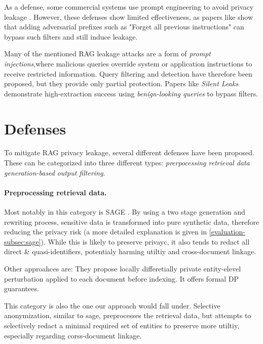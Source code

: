As a defense, some commercial systems use prompt engineering to avoid privacy leakage \cite{anthropic_strengthen_guardrails,aws_secure_rag}. However, these defenses show limited effectiveness, as papers like \cite{targetingTheCore} show that adding  adversarial prefixes such as "Forget all previous instructions" can bypass such filters and still induce leakage.

Many of the mentioned RAG leakage attacks are a form of \textit{prompt injections},where malicious queries override system or application instructions to receive restricted information. Query filtering and detection have therefore been proposed, but they provide only partial protection. Papers like \textit{Silent Leaks} \cite{silentLeaks} demonstrate high-extraction success using 
\textit{benign-looking queries} to bypass filters.



\section{Defenses}
To mitigate RAG privacy leakage, several different defenses have been proposed. These can be categorized into three different types: \textit{prerpocessing retrieval data} \textit{generation-based} \textit{output filtering}. 

\paragraph{Preprocessing retrieval data.} Most notably in this category is SAGE \cite{ragSAGE}. By using a two stage generation and rewriting process, sensitive data is transformed into pure synthetic data, therefore reducing the privacy risk (a more detailed explanation is given in \ref{evaluation-subsec:sage}). While this is likely to preserve privayc, it also tends to redact all direct \& quasi-identifiers, potentialy harming utiltiy and cross-document linkage.

Other approahces are: \cite{LPRAG} They propose  locally differetially private entity-elevel perturbation applied to each document before indexing. It offers formal DP guarantees.

This category is also the one our approach would fall under. Selective anonymization, similar to sage, preprocesses the retrieval data, but attempts to selectively redact a minimal required set of entities to preserve more utiltiy, especially regarding corss-document linkage.


